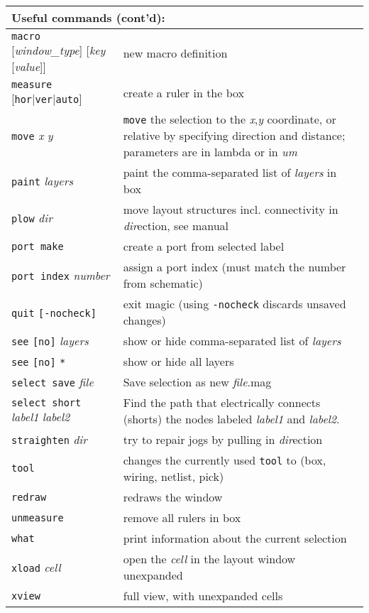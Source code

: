 \documentclass[10pt,a4paper]{article}
\newcommand{\mac}[1]{\texttt{#1}}
\newcommand{\argu}[1]{\textit{#1}}
\newcommand{\mouse}[1]{\texttt{#1}}
\begin{document}
	\begin{tabular}{p{}p{}}
		\toprule
		\multicolumn{2}{l}{Useful commands (cont'd):}\\
		\midrule
		\mac{macro} [\argu{window\_type}] [\argu{key} [\argu{value}]] & new macro definition \\
		\mac{measure} [\mac{hor}|\mac{ver}|\mac{auto}] & create a ruler in the box\\
		\mac{move} \argu{x} \argu{y} & \mac{move} the selection to the \argu{x},\argu{y} coordinate, or relative by specifying direction and distance; parameters are in lambda or in \argu{um}\\
		\mac{paint} \argu{layers} & paint the comma-separated list of \argu{layers} in box\\
		\mac{plow} \argu{dir} & move layout structures incl. connectivity in \argu{dir}ection, see manual\\
		\mac{port make} & create a port from selected label\\
		\mac{port index} \argu{number} & assign a port index (must match the number from schematic)\\ 
		\mac{quit} \mac{[-nocheck]} & exit magic (using \mac{-nocheck} discards unsaved changes)\\
		\mac{see} \mac{[no]} \argu{layers} & show or hide comma-separated list of \argu{layers}\\
		\mac{see} \mac{[no]} \mac{*} & show or hide all layers\\
		\mac{select save} \argu{file} & Save selection as new \argu{file}.mag\\
		\mac{select short} \argu{label1} \argu{label2} & Find the path that electrically connects (shorts) the nodes labeled \argu{label1} and \argu{label2}.\\
		\mac{straighten} \argu{dir} & try to repair jogs by pulling in \argu{dir}ection\\
		\mac{tool} & changes the currently used \mouse{tool} to (box, wiring, netlist, pick)\\
		\mac{redraw} & redraws the window\\
		\mac{unmeasure} & remove all rulers in box\\
		\mac{what} & print information about the current selection\\
		\mac{xload} \argu{cell} & open the \argu{cell} in the layout window unexpanded\\
		\mac{xview} & full view, with unexpanded cells\\
		\bottomrule
	\end{tabular}
	
\end{document}
